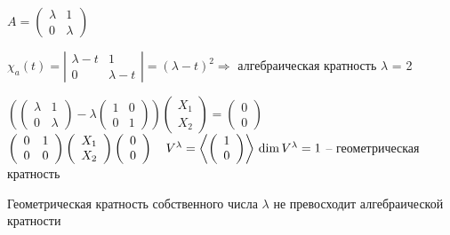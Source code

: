 \begin{Example}
	$A = \left(\begin{array}{cc}
		\lambda & 1\\
		0 & \lambda
	\end{array} \right)$
	
	$\chi_a(t) = \left|\begin{array}{cc}
	\lambda - t & 1\\
	0 & \lambda - t
	\end{array} \right| = (\lambda - t)^2 \Rightarrow$ алгебраическая кратность $\lambda$ = 2

	$\left( \left(\begin{array}{cc}
		\lambda & 1
		\\
		0 & \lambda
	\end{array}\right) - \lambda \left(\begin{array}{cc}
		1 & 0\\
		0 & 1
	\end{array}\right)\right) \left( \begin{array}{c}
		X_1\\
		X_2
	\end{array}\right) = \left( \begin{array}{c}
		0\\
		0
	\end{array} \right)$\\

	$\left(\begin{array}{cc}
		0 & 1\\
		0 & 0
	\end{array}\right)
	\left(\begin{array}{c}
		X_1\\
		X_2
	\end{array}\right)
	\left(\begin{array}{c}
		0\\
		0
	\end{array}\right) \ \ \ V^{\lambda} = \left\langle\left(\begin{array}{c}
		1\\
		0
	\end{array}\right)\right\rangle\\ \dim V^{\lambda} = 1$ -- геометрическая кратность
\end{Example}

\begin{Lm}
	Геометрическая кратность собственного числа $\lambda$ не превосходит алгебраической кратности
\end{Lm}

